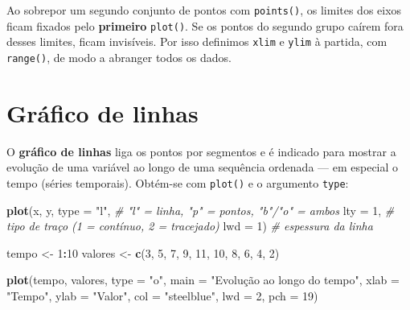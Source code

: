 \documentclass[
  portuguese,
  11pt,
  openany]{book}
\newenvironment{Shaded}{\begin{snugshade}}{\end{snugshade}}
\newcommand{\AttributeTok}[1]{\textcolor[rgb]{0.13,0.29,0.53}{#1}}
\newcommand{\CommentTok}[1]{\textcolor[rgb]{0.56,0.35,0.01}{\textit{#1}}}
\newcommand{\DecValTok}[1]{\textcolor[rgb]{0.00,0.00,0.81}{#1}}
\newcommand{\FunctionTok}[1]{\textcolor[rgb]{0.13,0.29,0.53}{\textbf{#1}}}
\newcommand{\NormalTok}[1]{#1}
\newcommand{\OtherTok}[1]{\textcolor[rgb]{0.56,0.35,0.01}{#1}}
\newcommand{\SpecialCharTok}[1]{\textcolor[rgb]{0.81,0.36,0.00}{\textbf{#1}}}
\newcommand{\StringTok}[1]{\textcolor[rgb]{0.31,0.60,0.02}{#1}}
\begin{document}
Ao sobrepor um segundo conjunto de pontos com \texttt{points()}, os limites dos eixos ficam
fixados pelo \textbf{primeiro} \texttt{plot()}. Se os pontos do segundo grupo caírem fora desses
limites, ficam invisíveis. Por isso definimos \texttt{xlim} e \texttt{ylim} à partida, com
\texttt{range()}, de modo a abranger todos os dados.

\section{Gráfico de linhas}\label{gruxe1fico-de-linhas}

O \textbf{gráfico de linhas} liga os pontos por segmentos e é indicado para mostrar a
evolução de uma variável ao longo de uma sequência ordenada --- em especial o tempo
(séries temporais). Obtém-se com \texttt{plot()} e o argumento \texttt{type}:

\begin{Shaded}
\begin{Highlighting}[]
\FunctionTok{plot}\NormalTok{(x, y,}
     \AttributeTok{type =} \StringTok{"l"}\NormalTok{,   }\CommentTok{\# "l" = linha, "p" = pontos, "b"/"o" = ambos}
     \AttributeTok{lty =} \DecValTok{1}\NormalTok{,      }\CommentTok{\# tipo de traço (1 = contínuo, 2 = tracejado)}
     \AttributeTok{lwd =} \DecValTok{1}\NormalTok{)      }\CommentTok{\# espessura da linha}
\end{Highlighting}
\end{Shaded}

\begin{Shaded}
\begin{Highlighting}[]
\NormalTok{tempo }\OtherTok{\textless{}{-}} \DecValTok{1}\SpecialCharTok{:}\DecValTok{10}
\NormalTok{valores }\OtherTok{\textless{}{-}} \FunctionTok{c}\NormalTok{(}\DecValTok{3}\NormalTok{, }\DecValTok{5}\NormalTok{, }\DecValTok{7}\NormalTok{, }\DecValTok{9}\NormalTok{, }\DecValTok{11}\NormalTok{, }\DecValTok{10}\NormalTok{, }\DecValTok{8}\NormalTok{, }\DecValTok{6}\NormalTok{, }\DecValTok{4}\NormalTok{, }\DecValTok{2}\NormalTok{)}

\FunctionTok{plot}\NormalTok{(tempo, valores,}
     \AttributeTok{type =} \StringTok{"o"}\NormalTok{,}
     \AttributeTok{main =} \StringTok{"Evolução ao longo do tempo"}\NormalTok{,}
     \AttributeTok{xlab =} \StringTok{"Tempo"}\NormalTok{,}
     \AttributeTok{ylab =} \StringTok{"Valor"}\NormalTok{,}
     \AttributeTok{col =} \StringTok{"steelblue"}\NormalTok{,}
     \AttributeTok{lwd =} \DecValTok{2}\NormalTok{,}
     \AttributeTok{pch =} \DecValTok{19}\NormalTok{)}
\end{Highlighting}
\end{Shaded}
\end{document}
